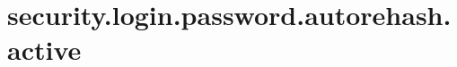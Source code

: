 \section{security.login.password.autorehash.active}
\label{configuration:SecurityLoginPasswordAutorehashActive}
\AvailableInJavaOnly{\TODO}